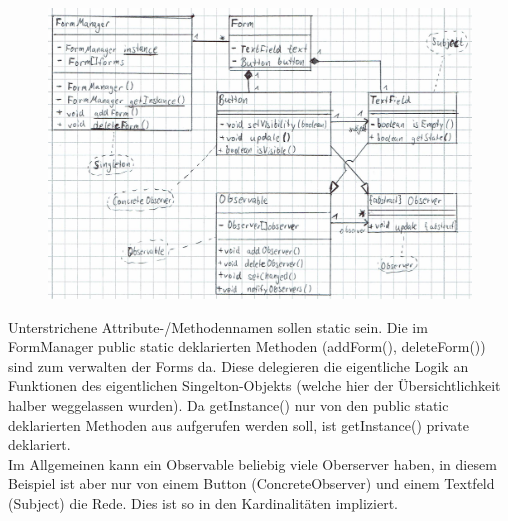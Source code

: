 \begin{figure}[h]
  \centerfloat
  \includegraphics{1_forms}
\end{figure}
Unterstrichene Attribute-/Methodennamen sollen static sein. Die im FormManager public static deklarierten Methoden (addForm(), deleteForm()) sind zum verwalten der Forms da.
Diese delegieren die eigentliche Logik an Funktionen des eigentlichen Singelton-Objekts (welche hier der Übersichtlichkeit halber weggelassen wurden). Da getInstance() nur
von den public static deklarierten Methoden aus aufgerufen werden soll, ist getInstance() private deklariert.\\
Im Allgemeinen kann ein Observable beliebig viele Oberserver haben, in diesem Beispiel ist aber nur von einem Button (ConcreteObserver) und einem Textfeld (Subject) die Rede.
Dies ist so in den Kardinalitäten impliziert.
